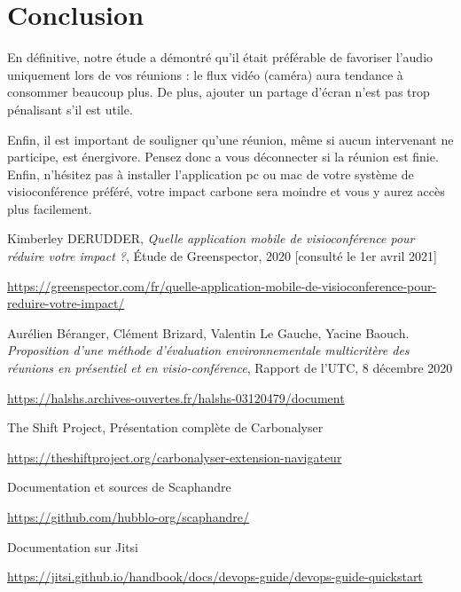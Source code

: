 \documentclass[11pt,a4paper]{report}
\begin{document}
\chapter*{Conclusion}

En définitive, notre étude a démontré qu'il était préférable de favoriser l’audio uniquement lors de vos réunions : le flux vidéo (caméra) aura tendance à consommer beaucoup plus. De plus, ajouter un partage d’écran n’est pas trop pénalisant s’il est utile.

Enfin, il est important de souligner qu'une réunion, même si aucun intervenant ne participe, est énergivore. Pensez donc a vous déconnecter si la réunion est finie. Enfin, n'hésitez pas à installer l'application pc ou mac de votre système de visioconférence préféré, votre impact carbone sera moindre et vous y aurez accès plus facilement.


\begin{thebibliography}{9}
Kimberley DERUDDER, \textit{Quelle application mobile de visioconférence pour réduire votre impact ?}, Étude de Greenspector, 2020 [consulté le 1er avril 2021]

\url{https://greenspector.com/fr/quelle-application-mobile-de-visioconference-pour-reduire-votre-impact/}

Aurélien Béranger, Clément Brizard, Valentin Le Gauche, Yacine Baouch. \textit{Proposition d’une méthode d'évaluation environnementale multicritère des réunions en présentiel et en visio-conférence}, Rapport de l'UTC, 8 décembre 2020

\url{https://halshs.archives-ouvertes.fr/halshs-03120479/document}

The Shift Project, Présentation complète de Carbonalyser

\url{https://theshiftproject.org/carbonalyser-extension-navigateur}

Documentation et sources de Scaphandre

\url{https://github.com/hubblo-org/scaphandre/}

Documentation sur Jitsi

\url{https://jitsi.github.io/handbook/docs/devops-guide/devops-guide-quickstart}


\end{thebibliography}
\end{document}
